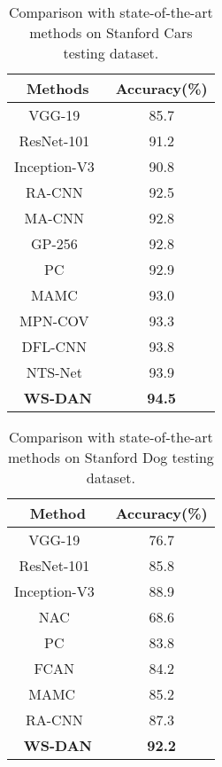 \documentclass[10pt,twocolumn,letterpaper]{article}
\begin{document}
\begin{table}[h]
	\begin{center}
		\scriptsize
		\begin{tabular}{c|c}
			\hline
			Methods & Accuracy(\%)\\
			\hline
      VGG-19~\cite{vgg} & 85.7\\
			ResNet-101~\cite{resnet} & 91.2\\
			Inception-V3~\cite{inception} & 90.8 \\
			\hline
			RA-CNN~\cite{ra-cnn} & 92.5\\
			MA-CNN~\cite{ma-cnn} & 92.8  \\
      GP-256~\cite{gp} & 92.8\\
      PC~\cite{pairwise_confusion} & 92.9 \\
      MAMC~\cite{mamc} & 93.0 \\
      MPN-COV~\cite{mpn-cov} & 93.3\\
      DFL-CNN~\cite{dfl-cnn} & 93.8 \\
      NTS-Net~\cite{nes-net} & 93.9\\
      \hline
			\textbf{WS-DAN} & \textbf{94.5}\\
			\hline
		\end{tabular}
	\end{center}
	\caption {Comparison with state-of-the-art methods on Stanford Cars testing dataset. }
	\label{tab:car}
\end{table}


\begin{table}[h]
    \begin{center}
        \scriptsize
        \begin{tabular}{c|c}
            \hline
            Method & Accuracy(\%)\\
            \hline
            VGG-19~\cite{vgg} & 76.7\\
            ResNet-101~\cite{resnet} & 85.8\\
            Inception-V3~\cite{inception} & 88.9 \\
            \hline
            NAC~\cite{nac} & 68.6\\
PC~\cite{pairwise_confusion} & 83.8 \\
            FCAN~\cite{fcan} & 84.2 \\
MAMC ~\cite{mamc} & 85.2\\
            RA-CNN~\cite{ra-cnn} & 87.3\\
            \hline
            \textbf{WS-DAN} & \textbf{92.2}\\
            \hline
        \end{tabular}
    \end{center}
    \caption {Comparison with state-of-the-art methods on Stanford Dog testing dataset. }
    \label{tab:dog}
\end{table}
\end{document}
